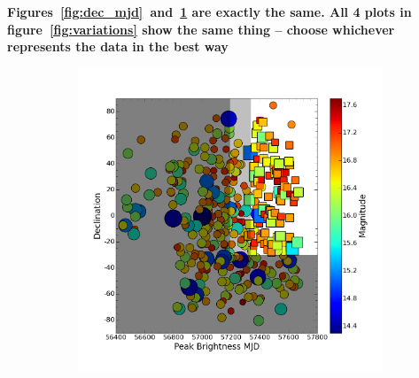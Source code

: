 

{\bf Figures~\ref{fig:dec_mjd}~and~\ref{fig:var1} are exactly the same. All 4 plots in figure~\ref{fig:variations} show the same thing -- choose whichever represents the data in the best way}



\begin{figure}
	\centering
	\begin{subfigure}{.5\textwidth}
	  \centering
	  \includegraphics[width=1\linewidth]{figures/invert_mag.png}
		\caption{\it \small{ }}
		\label{fig:var1}
	\end{subfigure}%
	\begin{subfigure}{.5\textwidth}
	  \centering

\end{subfigure}
\end{figure}
